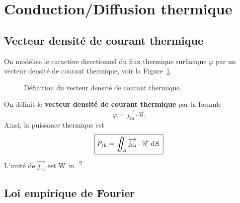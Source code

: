 \section{Conduction/Diffusion thermique}

    \subsection{Vecteur densité de courant thermique}

        On modélise le caractère directionnel du flux thermique surfacique $\varphi$ par un vecteur densité de courant thermique, voir la Figure~\ref{fig:vecteur_densite_courant_thermique}.

        \begin{figure}
            \centering
            \caption{Définition du vecteur densité de courant thermique.}    
            \label{fig:vecteur_densite_courant_thermique}
        \end{figure}

        \begin{definition}
            On définit le \textbf{vecteur densité de courant thermique} par la formule
            \begin{equation*}
                \varphi=\vec{j_{\text{th}}}\cdot\vec{n}.
            \end{equation*}
            Ainsi, la puissance thermique est
            \begin{equation*}
                \boxed{
                    P_{\text{th}}=\iint_{S}\protect\overrightarrow{{j_{\text{th}}}}\cdot\protect\overrightarrow{{n}}~\mathrm{d} S.
                }
            \end{equation*}
            L'unité de $\vec{j_{\text{th}}}$ est \si{\watt\per\metre\squared}.
        \end{definition}

    \subsection{Loi empirique de Fourier}

